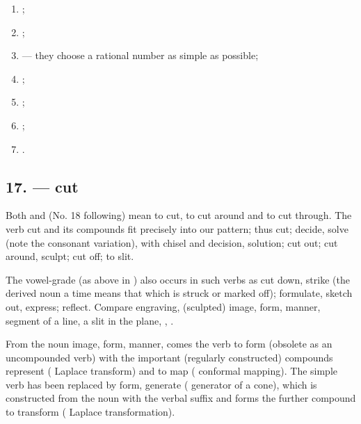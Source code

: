 \begin{enumerate}[label=\alph*)]
\item {};
\item {};
\item {} --- they choose a rational number as simple as possible;
\item {};
\item {};
\item {};
\item {}.
\end{enumerate}

\subsection*{17.  --- cut}

Both  and  (No. 18 following) mean to cut,  to cut around and  to cut through. The verb  cut and its compounds fit precisely into our pattern; thus  cut;  decide, solve (note the consonant variation), with  chisel and  decision, solution;  cut out;  cut around, sculpt;  cut off;  to slit.

The vowel-grade  (as above in ) also occurs in such verbs as  cut down, strike (the derived noun  a time means that which is struck or marked off);  formulate, sketch out, express;  reflect. Compare  engraving,  (sculpted) image, form, manner,  segment of a line,  a slit in the plane, , .

From the noun  image, form, manner, comes the verb  to form (obsolete as an uncompounded verb) with the important (regularly constructed) compounds  represent ( Laplace transform) and  to map ( conformal mapping). The simple verb  has been replaced by  form, generate ( generator of a cone), which is constructed from the noun  with the verbal suffix  and forms the further compound  to transform ( Laplace transformation).

